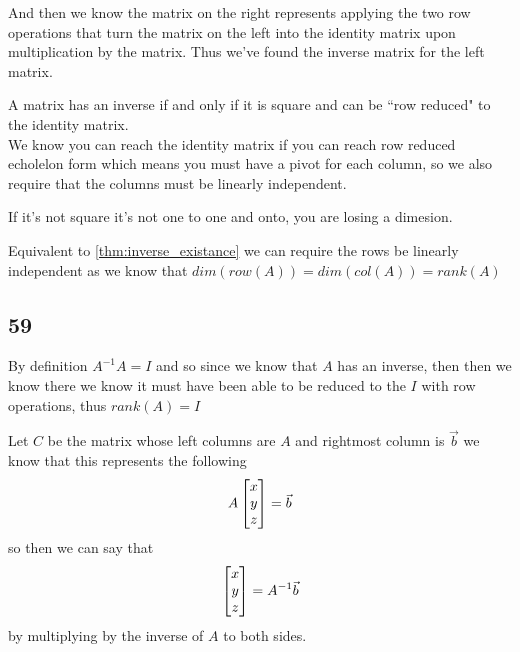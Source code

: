 \documentclass[11pt]{book}
\begin{document}
And then we know the matrix on the right represents applying the two row operations that turn the matrix on the left into the identity matrix upon multiplication by the matrix. Thus we've found the inverse matrix for the left matrix.

\begin{thm}\label{thm:inverse_existance}
    A matrix has an inverse if and only if it is square and can be ``row reduced" to the identity matrix.\\
    We know you can reach the identity matrix if you can reach row reduced echolelon form which means you must have a pivot for each column, so we also require that the columns must be linearly independent.
\end{thm}

\begin{remark}
    If it's not square it's not one to one and onto, you are losing a dimesion.  
\end{remark}

\begin{remark}
    Equivalent to \cref{thm:inverse_existance} we can require the rows be linearly independent as we know that $\mathit{dim} \left(\mathit{row} \left(A\right) \right) = \mathit{dim} \left(\mathit{col} \left(A\right) \right)= \mathit{rank} \left(A\right)  $   
\end{remark}

\subsection{59}%
\label{sub:59}

By definition $A^{-1} A = I$ and so since we know that $A$ has an inverse, then then we know there we know it must have been able to be reduced to the $I$ with row operations, thus $\mathit{rank} \left(A\right) = I$ 

\begin{eg}
    Let $C$ be the matrix whose left columns are $A$ and rightmost column is $\vec{b} $ we know that this represents the following 
    \[
    A \begin{bmatrix} x \\ y \\ z \end{bmatrix} = \vec{b} 
    \]
    so then we can say that
    \[
    \begin{bmatrix} x \\ y \\ z \end{bmatrix} = A^{-1} \vec{b} 
    \]
    by multiplying by the inverse of $A$ to both sides.
\end{eg}
\end{document}
